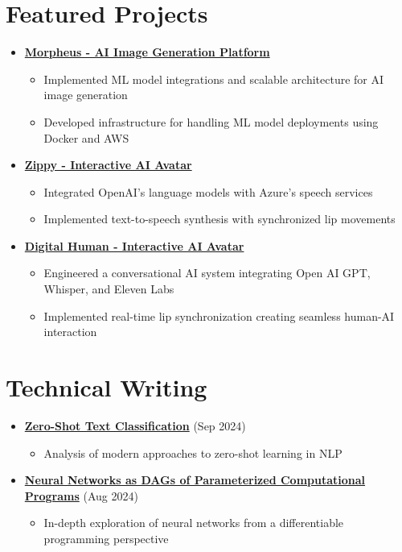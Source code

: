 \documentclass[letterpaper,11pt]{article}
\newcommand{\normalfaExternalLink}{{\mdseries\faExternalLink}}
\begin{document}
\section{Featured Projects}
\begin{itemize}[leftmargin=*]
    \item \textbf{\href{https://github.com/Monadical-SAS/Morpheus}{Morpheus - AI Image Generation Platform \normalfaExternalLink}}
    \begin{itemize}
        \item Implemented ML model integrations and scalable architecture for AI image generation
        \item Developed infrastructure for handling ML model deployments using Docker and AWS
    \end{itemize}
    
    \item \textbf{\href{https://github.com/asanchezyali/ai-avatar}{Zippy - Interactive AI Avatar \normalfaExternalLink}}
    \begin{itemize}
        \item Integrated OpenAI's language models with Azure's speech services
        \item Implemented text-to-speech synthesis with synchronized lip movements
    \end{itemize}
       \item \textbf{\href{https://github.com/asanchezyali/talking-avatar-with-ai}{Digital Human - Interactive AI Avatar \normalfaExternalLink}}
    \begin{itemize}
        \item Engineered a conversational AI system integrating Open AI GPT, Whisper, and Eleven Labs
        \item Implemented real-time lip synchronization creating seamless human-AI interaction
    \end{itemize}
\end{itemize}

\section{Technical Writing}
\begin{itemize}[leftmargin=*]
    \item \textbf{\href{https://www.asanchezyali.com/blog/ai/20240917ZeroShot}{Zero-Shot Text Classification}} (Sep 2024)
    \begin{itemize}
        \item Analysis of modern approaches to zero-shot learning in NLP
    \end{itemize}
    
    \item \textbf{\href{https://www.asanchezyali.com/blog/differentiable-programming/20240923DifferentiablePrograms}{Neural Networks as DAGs of Parameterized Computational Programs}} (Aug 2024)
    \begin{itemize}
        \item In-depth exploration of neural networks from a differentiable programming perspective
    \end{itemize}
\end{itemize}
\end{document}

